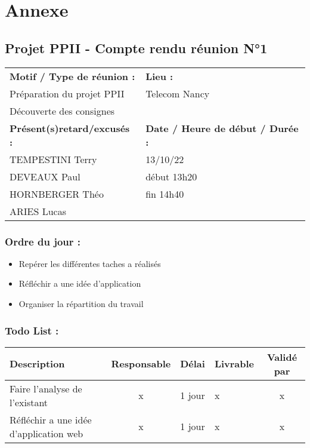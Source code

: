 \documentclass{report}
\begin{document}
\newpage
\chapter*{Annexe}

\section*{Projet PPII - Compte rendu réunion N°1}
\begin{tabular}{|p{7cm}|p{6cm}|}
    \hline
    \textbf{Motif / Type de réunion :}
    & \textbf{Lieu :}
    \\
    Préparation du projet PPII
    & 
    Telecom Nancy
    \\ 
    Découverte des consignes &
    \\\hline
    \textbf{Présent(s)retard/excusés :}
    &
    \textbf{Date / Heure de début / Durée :}
    \\ 
    TEMPESTINI Terry &  13/10/22\\  
    DEVEAUX Paul & début 13h20\\
    HORNBERGER Théo & fin 14h40\\
    ARIES Lucas & 
    \\ \hline
\end{tabular}

\subsection*{Ordre du jour :}
\begin{itemize}
    \item{Repérer les différentes taches a réalisés}
    \item{Réfléchir a une idée d’application}
    \item{Organiser la répartition du travail}
\end{itemize}

\subsection*{Todo List :}
\begin{tabular}{|p{3.5cm}|c|c|p{4.5cm}|c|}
    \hline 
    Description & Responsable & Délai & Livrable & Validé par 
    \\ \hline
    Faire l’analyse de l’existant & x & 1 jour & x & x
    \\ \hline
    Réfléchir a une idée d’application web & x & 1 jour & x & x
    \\ \hline
\end{tabular}
\end{document}
